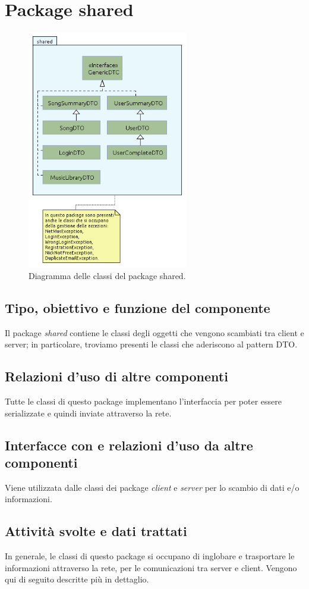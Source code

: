 \section{Package shared} %
\begin{figure}[h]
  \centering
  \includegraphics[width=7cm]{img/ST/Shared.png}
\caption{Diagramma delle classi del package shared.}
\end{figure}
\subsection*{Tipo, obiettivo e funzione del componente}
Il package \emph{shared} contiene le classi degli oggetti che vengono
scambiati tra client e server; in particolare, troviamo presenti le classi che
aderiscono al pattern DTO.
\subsection*{Relazioni d'uso di altre componenti}
Tutte le classi di questo package implementano l'interfaccia
 per poter essere serializzate e quindi inviate
attraverso la rete. 
\subsection*{Interfacce con e relazioni d'uso da altre componenti}
Viene utilizzata dalle classi dei package \emph{client} e \emph{server} per
lo scambio di dati e/o informazioni.
\subsection*{Attivit\`a svolte e dati trattati}
In generale, le classi di questo package si occupano di inglobare e trasportare
le informazioni attraverso la rete, per le comunicazioni tra server e client.
Vengono qui di seguito descritte pi\`u in dettaglio.

